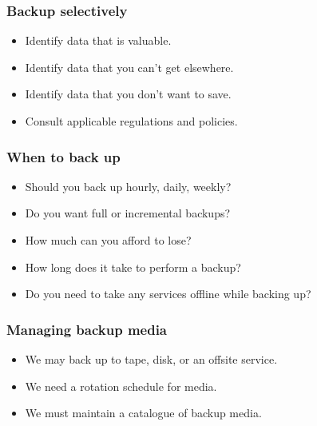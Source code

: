 \documentclass[10pt]{beamer}
\begin{document}
\begin{frame}
  \frametitle{Backup selectively}
 

\begin{itemize}
\item Identify data that is valuable.
\item Identify data that you can't get elsewhere.
\item Identify data that you don't want to save.
\item Consult applicable regulations and policies.
\end{itemize}
\end{frame}

\begin{frame}
  \frametitle{When to back up}
 

\begin{itemize}
\item  Should you back up hourly, daily, weekly?
\item  Do you want full or incremental backups?
\item  How much can you afford to lose?
\item  How long does it take to perform a backup?
\item  Do you need to take any services offline while backing up? 
\end{itemize}
\end{frame}


\begin{frame}
  \frametitle{Managing backup media}
 

\begin{itemize}
\item We may back up to tape, disk, or an offsite service. 
\item We need a rotation schedule for media.
\item We must maintain a catalogue of backup media.
\end{itemize}
\end{frame}
\end{document}
